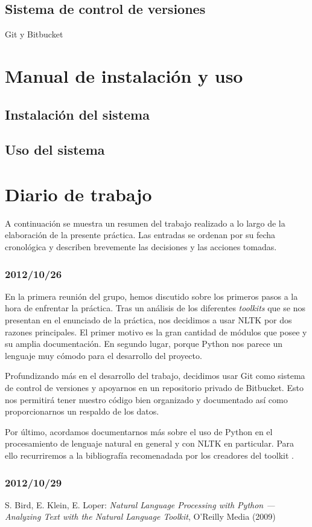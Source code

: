 \documentclass[12pt,a4paper,titlepage]{article}
\begin{document}
\subsection{Sistema de control de versiones}
Git y Bitbucket


\newpage
\section{Manual de instalación y uso}

\subsection{Instalación del sistema}


\subsection{Uso del sistema}



\newpage
\section{Diario de trabajo}
A continuación se muestra un resumen del trabajo realizado a lo largo de la elaboración de la presente práctica. Las entradas se ordenan por su fecha cronológica y describen brevemente las decisiones y las acciones tomadas.


\subsubsection*{2012/10/26}
En la primera reunión del grupo, hemos discutido sobre los primeros pasos a la hora de enfrentar la práctica. Tras un análisis de los diferentes \emph{toolkits} que se nos presentan en el enunciado de la práctica, nos decidimos a usar NLTK por dos razones principales. El primer motivo es la gran cantidad de módulos que posee y su amplia documentación. En segundo lugar, porque Python nos parece un lenguaje muy cómodo para el desarrollo del proyecto.

Profundizando más en el desarrollo del trabajo, decidimos usar Git como sistema de control de versiones y apoyarnos en un repositorio privado de Bitbucket. Esto nos permitirá tener nuestro código bien organizado y documentado así como proporcionarnos un respaldo de los datos.

Por último, acordamos documentarnos más sobre el uso de Python en el procesamiento de lenguaje natural en general y con NLTK en particular. Para ello recurriremos a la bibliografía recomenadada por los creadores del toolkit \cite{nltk}.

\subsubsection*{2012/10/29}


\newpage
\begin{thebibliography}{99}
S. Bird, E. Klein, E. Loper: \emph{Natural Language Processing with Python --- Analyzing Text with the Natural Language Toolkit}, O'Reilly Media (2009)
\end{thebibliography}
\end{document}
